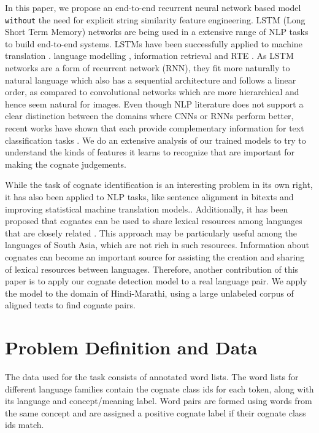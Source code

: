 \documentclass[11pt,letterpaper]{article}
\begin{document}
In this paper, we propose an end-to-end recurrent neural network based model \texttt{without} the need for explicit string similarity feature engineering. LSTM (Long Short Term Memory) networks are being used in a extensive range of NLP tasks to build end-to-end systems. LSTMs have been successfully applied to machine translation \citep{bahdanau2014neural}. language modelling \citep{mikolov2010recurrent}, information retrieval \citep{sordoni2015hierarchical} and RTE \citep{snli:emnlp2015}. As LSTM networks are a form of recurrent network (RNN), they fit more naturally to natural language which also has a sequential architecture and follows a linear order, as compared to convolutional networks which are more hierarchical and hence seem natural for images. Even though NLP literature does not support a clear distinction between the domains where CNNs or RNNs perform better, recent works have shown that each provide complementary information for text classification tasks \citep{yin2017comparative}. We do an extensive analysis of our trained models to try to understand the kinds of features it learns to recognize that are important for making the cognate judgements.

While the task of cognate identification is an interesting problem in its own right, it has also been applied to NLP tasks, like sentence alignment in bitexts and improving statistical machine translation models.\cite{Kondrak:2003,Simard:1993:UCA:962367.962411}. Additionally, it has been proposed that cognates can be used to share lexical resources among languages that are closely related \citep{Singh:07b}. This approach may be particularly useful among the languages of South Asia, which are not rich in such resources. Information about cognates can become an important source for assisting the creation and sharing of lexical resources between languages. Therefore, another contribution of this paper is to apply our cognate detection model to a real language pair. We apply the model to the domain of Hindi-Marathi, using a large unlabeled corpus of aligned texts to find cognate pairs.



\section{Problem Definition and Data}

The data used for the task consists of annotated word lists. The word lists for different language families contain the cognate class ids for each token, along with its language and concept/meaning label. Word pairs are formed using words from the same concept and are assigned a positive cognate label if their cognate class ids match.
\end{document}
